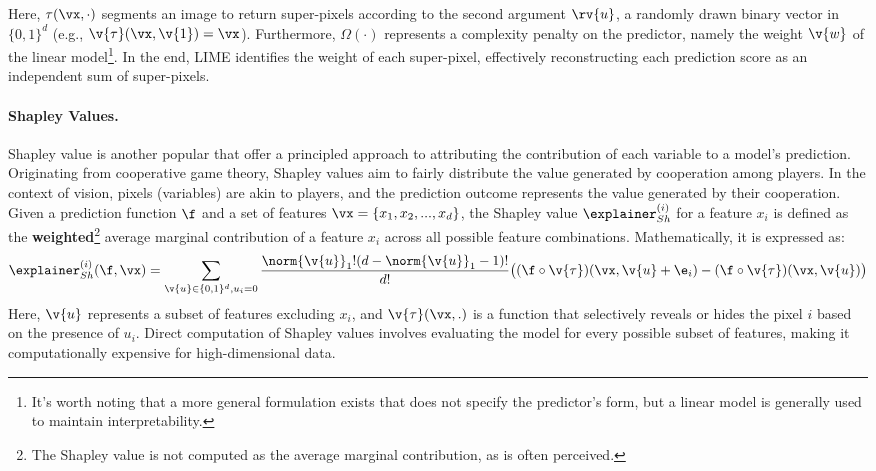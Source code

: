 Here, $\tau(\vx, \cdot)$ segments an image to return super-pixels according to the second argument $\rv{u}$, a randomly drawn binary vector in $\{0,1\}^d$ (e.g., $\v{\tau}(\vx, \v{1}) = \vx$). Furthermore, $\Omega(\cdot)$ represents a complexity penalty on the predictor, namely the weight $\v{w}$ of the linear model\footnote{It's worth noting that a more general formulation exists that does not specify the predictor's form, but a linear model is generally used to maintain interpretability.}. In the end, LIME identifies the weight of each super-pixel, effectively reconstructing each prediction score as an independent sum of super-pixels.

\paragraph{Shapley Values.} Shapley value is another popular that offer a principled approach to attributing the contribution of each variable to a model's prediction. Originating from cooperative game theory, Shapley values aim to fairly distribute the value generated by cooperation among players. In the context of vision, pixels (variables) are akin to players, and the prediction outcome represents the value generated by their cooperation. Given a prediction function $\f$ and a set of features $\vx = \{x_1, x_2, ..., x_d\}$, the Shapley value $\explainer_{Sh}^{(i)}$ for a feature $x_i$ is defined as the \textbf{weighted}\footnote{The Shapley value is not computed as the average marginal contribution, as is often perceived.} average marginal contribution of a feature $x_i$ across all possible feature combinations. Mathematically, it is expressed as:
$$
\explainer_{Sh}^{(i)}(\f, \vx) = \sum_{\v{u} \in \{0,1\}^d, u_i = 0} \frac{\norm{\v{u}}_1!(d - \norm{\v{u}}_1 - 1)!}{d!} \big(
(\f \circ \v{\tau})(\vx, \v{u} + \e_i) - (\f \circ \v{\tau})(\vx, \v{u})
\big)
$$
Here, $\v{u}$ represents a subset of features excluding $x_i$, and $\v{\tau}(\vx, .)$ is a function that selectively reveals or hides the pixel $i$ based on the presence of $u_i$. Direct computation of Shapley values involves evaluating the model for every possible subset of features, making it computationally expensive for high-dimensional data.

